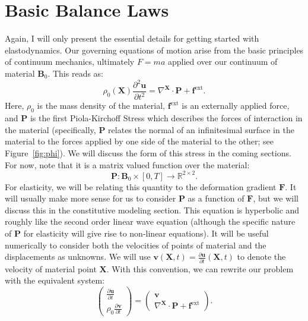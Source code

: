 \section*{Basic Balance Laws}

Again, I will only present the essential details for getting started with elastodynamics. Our governing equations of motion arise from the basic principles of continuum mechanics, ultimately $F = ma$ applied over our continuum of material $\mathbf{B}_0$. This reads as:
\begin{equation*}
\rho_0(\mathbf{X}) \frac{\partial^2 \mathbf{u}}{\partial t^2} = \nabla^{\mathbf{X}} \cdot \mathbf{P} + \mathbf{f}^{\text{ext}}.
\end{equation*}
Here, $\rho_0$ is the mass density of the material, $\mathbf{f}^\text{ext}$ is an externally applied force, and $\mathbf{P}$ is the first Piola-Kirchoff Stress which describes the forces of interaction in the material (specifically, $\mathbf{P}$ relates the normal of an infinitesimal surface in the material to the forces applied by one side of the material to the other; see Figure~\ref{fig:phi}). We will discuss the form of this stress in the coming sections. For now, note that it is a matrix valued function over the material:
\begin{equation*}
\mathbf{P} \colon \mathbf{B}_0 \times [0,T] \to \mathbb{R}^{2\times2}.
\end{equation*}
For elasticity, we will be relating this quantity to the deformation gradient $\mathbf{F}$. It will usually make more sense for us to consider $\mathbf{P}$ as a function of $\mathbf{F}$, but we will discuss this in the constitutive modeling section. This equation is hyperbolic and roughly like the second order linear wave equation (although the specific nature of $\mathbf{P}$ for elasticity will give rise to non-linear equations). It will be useful numerically to consider both the velocities of points of material and the displacements as unknowns. We will use $\mathbf{v}(\mathbf{X},t) = \frac{\partial\mathbf{u}}{\partial t}(\mathbf{X},t)$ to denote the velocity of material point $\mathbf{X}$. With this convention, we can rewrite our problem with the equivalent system:
\begin{equation*}
\begin{pmatrix}
\frac{\partial\mathbf{u}}{\partial t} \\
\rho_0 \frac{\partial\mathbf{v}}{\partial t}
\end{pmatrix}
= \begin{pmatrix}
\mathbf{v} \\
\nabla^{\mathbf{X}} \cdot \mathbf{P} + \mathbf{f}^{\text{ext}}
\end{pmatrix}.
\end{equation*}

